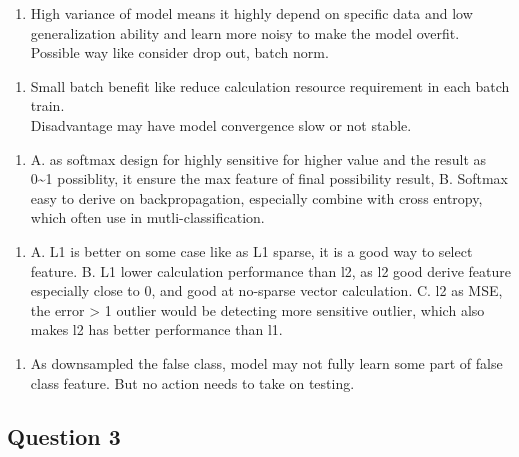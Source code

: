 \documentclass[11pt]{article}
\providecommand{\tightlist}{%
      \setlength{\itemsep}{0pt}\setlength{\parskip}{0pt}}
\begin{document}
    \begin{enumerate}
\def\labelenumi{(\alph{enumi})}
\setcounter{enumi}{3}
\tightlist
\item
  High variance of model means it highly depend on specific data and low
  generalization ability and learn more noisy to make the model overfit.
  Possible way like consider drop out, batch norm.
\end{enumerate}

    \begin{enumerate}
\def\labelenumi{(\alph{enumi})}
\setcounter{enumi}{4}
\tightlist
\item
  Small batch benefit like reduce calculation resource requirement in
  each batch train.\\
  Disadvantage may have model convergence slow or not stable.
\end{enumerate}

    \begin{enumerate}
\def\labelenumi{(\alph{enumi})}
\setcounter{enumi}{5}
\tightlist
\item
  A. as softmax design for highly sensitive for higher value and the
  result as 0\textasciitilde1 possiblity, it ensure the max feature of
  final possibility result, B. Softmax easy to derive on
  backpropagation, especially combine with cross entropy, which often
  use in mutli-classification.
\end{enumerate}

    \begin{enumerate}
\def\labelenumi{(\alph{enumi})}
\setcounter{enumi}{6}
\tightlist
\item
  A. L1 is better on some case like as L1 sparse, it is a good way to
  select feature. B. L1 lower calculation performance than l2, as l2
  good derive feature especially close to 0, and good at no-sparse
  vector calculation. C. l2 as MSE, the error \textgreater{} 1 outlier
  would be detecting more sensitive outlier, which also makes l2 has
  better performance than l1.
\end{enumerate}

    \begin{enumerate}
\def\labelenumi{(\alph{enumi})}
\setcounter{enumi}{7}
\tightlist
\item
  As downsampled the false class, model may not fully learn some part of
  false class feature. But no action needs to take on testing.
\end{enumerate}

    \hypertarget{question-3}{%
\subsection{Question 3}\label{question-3}}
\end{document}
